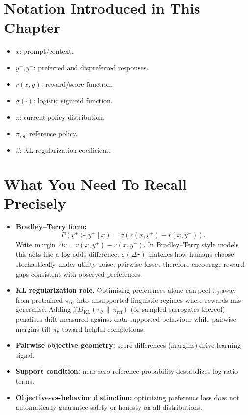 \section*{Notation Introduced in This Chapter}
\begin{itemize}[leftmargin=1.5em]
  \item $x$: prompt/context.
  \item $y^+, y^-$: preferred and dispreferred responses.
  \item $r(x,y)$: reward/score function.
  \item $\sigma(\cdot)$: logistic sigmoid function.
  \item $\pi$: current policy distribution.
  \item $\pi_{\mathrm{ref}}$: reference policy.
  \item $\beta$: KL regularization coefficient.
\end{itemize}

\section*{What You Need To Recall Precisely}
\begin{itemize}[leftmargin=1.5em]
  \item \textbf{Bradley--Terry form:}
  \[
    P(y^+ \succ y^- \mid x)=\sigma(r(x,y^+)-r(x,y^-)).
  \]
  Write margin \(\Delta r = r(x,y^+)-r(x,y^-)\). In Bradley--Terry style models this acts like a log-odds difference: \(\sigma(\Delta r)\) matches how humans choose stochastically under utility noise; pairwise losses therefore encourage reward gaps consistent with observed preferences.

  \item \textbf{KL regularization role.}
  Optimising preferences alone can peel \(\pi_\theta\) away from pretrained \(\pi_{\mathrm{ref}}\) into unsupported linguistic regimes where rewards mis-generalise. Adding \(\beta\, D_{\mathrm{KL}}(\pi_\theta \,\|\, \pi_{\mathrm{ref}})\) (or sampled surrogates thereof) penalises drift measured against data-supported behaviour while pairwise margins tilt \(\pi_\theta\) toward helpful completions.

  \item \textbf{Pairwise objective geometry:} score differences (margins) drive learning signal.
  \item \textbf{Support condition:} near-zero reference probability destabilizes log-ratio terms.
  \item \textbf{Objective-vs-behavior distinction:} optimizing preference loss does not automatically guarantee safety or honesty on all distributions.
\end{itemize}


